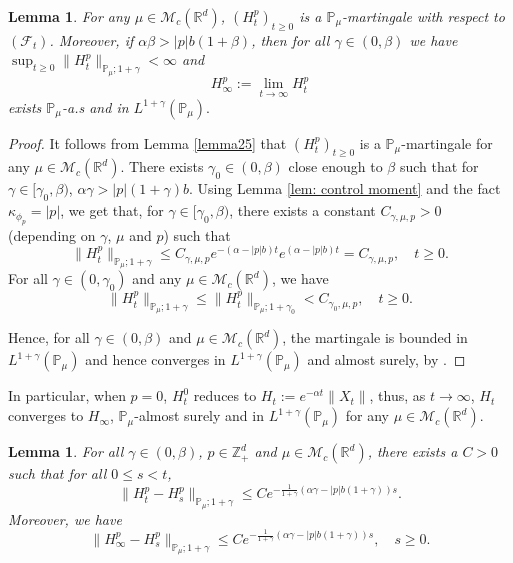 \documentclass[12pt,a4paper]{amsart}
\theoremstyle{plain}
\newtheorem{lem}[thm]{Lemma}
\theoremstyle{definition}
\numberwithin{equation}{section}
\begin{document}
\begin{lem}\label{lemma26}
    For any $\mu\in \mathcal M_c(\mathbb R^d)$, $(H^p_t)_{t\geq 0}$ is a $\mathbb P_\mu$-martingale with respect to $(\mathscr F_t)$. Moreover, if $\alpha\beta>|p|b(1+\beta)$, then for all $\gamma\in (0, \beta)$ we have $\sup_{t\geq 0}\|H_t^p\|_{\mathbb P_\mu;1+\gamma}< \infty$ and
\[
    H_{\infty}^p
    :=\lim_{t\rightarrow \infty}H_t^p
\]
    exists $\mathbb{P}_{\mu}$-a.s and in $L^{1+\gamma}(\mathbb{P}_{\mu}).$
\end{lem}
\begin{proof}
    It follows from Lemma \ref{lemma25} that $(H_t^p)_{t\geq 0}$ is a $\mathbb P_\mu$-martingale for any $\mu\in \mathcal M_c(\mathbb R^d)$.
    There exists $\gamma_0 \in (0,\beta)$ close enough to $\beta$ such that for $\gamma\in [\gamma_0, \beta)$, $\alpha\gamma>|p|(1+\gamma)b$.
    Using  Lemma \ref{lem: control moment} and the fact $\kappa_{\phi_p}=|p|$, we get that, for $\gamma\in [\gamma_0, \beta)$, there exists a constant $C_{\gamma, \mu, p}>0$ (depending on $\gamma$, $\mu$ and $p$) such that
\[
 	\|H_t^p\|_{\mathbb P_\mu;1+\gamma}
    \leq C_{\gamma, \mu, p} e^{-(\alpha-|p|b)t}e^{(\alpha-|p|b)t}
    =C_{\gamma, \mu, p}, \quad t\geq 0.
\]
    For all $\gamma\in (0, \gamma_0)$ and any $\mu\in \mathcal M_c(\mathbb R^d)$, we have 
\[
	\|H_t^p\|_{\mathbb P_\mu;1+\gamma}
	\leq\|H_t^p\|_{\mathbb P_\mu;1+\gamma_0}
	<C_{\gamma_0, \mu, p},
	\quad t\geq 0.
\]

    Hence, for all $\gamma \in (0,\beta)$ and $\mu\in \mathcal M_c(\mathbb R^d)$, the martingale is bounded in $L^{1+\gamma}(\mathbb{P}_{\mu})$ and hence converges in $L^{1+\gamma}(\mathbb{P}_{\mu}) $ and almost surely, by \cite[Theorem 5.4.5]{Durrett2010Probability}.
\end{proof}

    In particular, when $p=0$, $H_t^0$ reduces to $H_t:=e^{-\alpha t}\|X_t\|$, thus, as $t\rightarrow \infty$, $H_t$ converges to $H_{\infty}$, $\mathbb{P}_{\mu}$-almost surely and in $L^{1+\gamma}(\mathbb{P}_{\mu})$  for any $\mu\in \mathcal M_c(\mathbb R^d)$.

\begin{lem}\label{lem: control of wt} 
    For all $\gamma\in (0,\beta)$, $p\in \mathbb{Z}_+^d$ and $\mu\in \mathcal M_c(\mathbb R^d)$, there exists a $C> 0$ such that for all $0\leq s<t$,
\[
    \|H^p_t-H^p_s\|_{\mathbb{P}_{\mu};1+\gamma}
    \leq C e^{-\frac{ 1}{1+\gamma}(\alpha\gamma-|p|b(1+\gamma))s}.
\]
    Moreover, we have
\[
    \|H^p_\infty-H^p_s\|_{\mathbb{P}_{\mu};1+\gamma}
    \leq C e^{-\frac{ 1}{1+\gamma}(\alpha\gamma-|p|b(1+\gamma))s},\quad s\geq 0.
\]
\end{lem}
\end{document}
